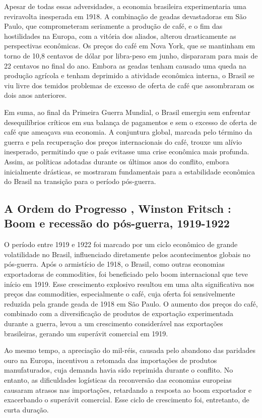 \documentclass[a4paper,12pt]{article}[abntex2]
\begin{document}
Apesar de todas essas adversidades, a economia brasileira experimentaria uma reviravolta inesperada em 1918. A combinação de geadas devastadoras em São Paulo, que comprometeram seriamente a produção de café, e o fim das hostilidades na Europa, com a vitória dos aliados, alterou drasticamente as perspectivas econômicas. Os preços do café em Nova York, que se mantinham em torno de 10,8 centavos de dólar por libra-peso em junho, dispararam para mais de 22 centavos no final do ano. Embora as geadas tenham causado uma queda na produção agrícola e tenham deprimido a atividade econômica interna, o Brasil se viu livre dos temidos problemas de excesso de oferta de café que assombraram os dois anos anteriores.

Em suma, ao final da Primeira Guerra Mundial, o Brasil emergiu sem enfrentar desequilíbrios críticos em sua balança de pagamentos e sem o excesso de oferta de café que ameaçava sua economia. A conjuntura global, marcada pelo término da guerra e pela recuperação dos preços internacionais do café, trouxe um alívio inesperado, permitindo que o país evitasse uma crise econômica mais profunda. Assim, as políticas adotadas durante os últimos anos do conflito, embora inicialmente drásticas, se mostraram fundamentais para a estabilidade econômica do Brasil na transição para o período pós-guerra.

\newpage
\subsection{\textbf{A Ordem do Progresso , Winston Fritsch : Boom e recessão do pós-guerra, 1919-1922}}

O período entre 1919 e 1922 foi marcado por um ciclo econômico de grande volatilidade no Brasil, influenciado diretamente pelos acontecimentos globais no pós-guerra. Após o armistício de 1918, o Brasil, como outras economias exportadoras de commodities, foi beneficiado pelo boom internacional que teve início em 1919. Esse crescimento explosivo resultou em uma alta significativa nos preços das commodities, especialmente o café, cuja oferta foi sensivelmente reduzida pela grande geada de 1918 em São Paulo. O aumento dos preços do café, combinado com a diversificação de produtos de exportação experimentada durante a guerra, levou a um crescimento considerável nas exportações brasileiras, gerando um superávit comercial em 1919.

Ao mesmo tempo, a apreciação do mil-réis, causada pelo abandono das paridades ouro na Europa, incentivou a retomada das importações de produtos manufaturados, cuja demanda havia sido reprimida durante o conflito. No entanto, as dificuldades logísticas da reconversão das economias europeias causaram atrasos nas importações, retardando a resposta ao boom exportador e exacerbando o superávit comercial. Esse ciclo de crescimento foi, entretanto, de curta duração.
\end{document}
